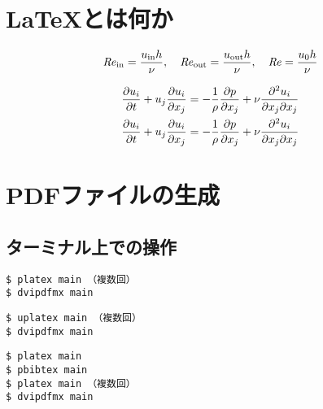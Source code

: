 \documentclass[
    paper=a4paper,      %
    report,             %
    fleqn,              %
    fontsize=12pt,      %
    jafontsize=12pt,    %
    head_space=33mm,    %
    foot_space=30mm,    %
    gutter=25mm,        %
    fore-edge=10mm      %
    ]{jlreq}            %
\begin{document}
\lipsum[1]

\section{\LaTeX とは何か}
\label{sec:whatislatex}

\begin{equation}
    \mathit{Re}_{\mathrm{in}} = \frac{u_{\mathrm{in}} h}{\nu}, \quad \mathit{Re}_{\mathrm{out}} = \frac{u_{\mathrm{out}} h}{\nu}, \quad \mathit{Re} = \frac{u_0 h}{\nu}
\end{equation}

\begin{align}
    \frac{\partial u_i}{\partial t} + u_j\frac{\partial u_i}{\partial x_j} &= - \frac{1}{\rho}\frac{\partial p}{\partial x_j} + \nu\frac{\partial^2 u_i}{\partial x_j \partial x_j} \\
    \pdv{u_i}{t} + u_j\pdv{u_i}{x_j} &= - \frac{1}{\rho}\pdv{p}{x_j} + \nu\pdv{u_i}{x_j}{x_j}
\end{align}

\section{PDFファイルの生成}
\label{sec:makepdf}

\subsection{ターミナル上での操作}
\label{ssec:terminal}

\begin{tcolorbox}[enhanced, title=\pLaTeX, drop fuzzy shadow]
\begin{verbatim}
$ platex main （複数回）
$ dvipdfmx main
\end{verbatim}
\end{tcolorbox}


\begin{tcolorbox}[enhanced, title=\upLaTeX, drop fuzzy shadow]
\begin{verbatim}
$ uplatex main （複数回）
$ dvipdfmx main
\end{verbatim}
\end{tcolorbox}


\begin{tcolorbox}[enhanced, title=\pLaTeX$+$\pBibTeX, drop fuzzy shadow]
\begin{verbatim}
$ platex main
$ pbibtex main
$ platex main （複数回）
$ dvipdfmx main
\end{verbatim}
\end{tcolorbox}
\end{document}
